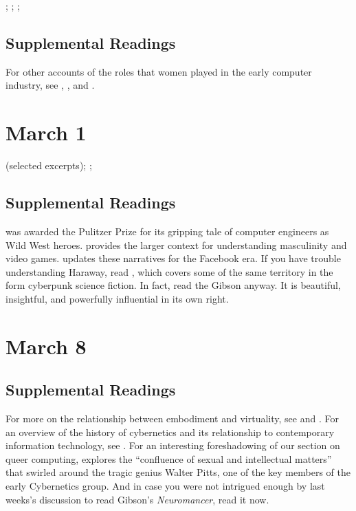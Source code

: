\documentclass[11pt]{article}
\begin{document}
; ; ;

\subsection{Supplemental Readings}
\label{sec:org04c01ec}

For other accounts of the roles that women played in the early computer
industry, see \cite{Shetterly:2016vl}, \cite{Grier:2005tq}, and
\cite{Gurer:1996it}.

\section{March 1}
\label{sec:orgf9e3bf0}

 (selected excerpts); 
; 

\subsection{Supplemental Readings}
\label{sec:org079b5b5}

\cite{Kidder:1981tj} was awarded the Pulitzer Prize for its gripping
tale of computer engineers as Wild West heroes. \cite{Kocurek:2015cg}
provides the larger context for understanding masculinity and video
games. \cite{Losse:2012um} updates these narratives for the Facebook
era. If you have trouble understanding Haraway, read
\cite{Gibson:1995un}, which covers some of the same territory in the
form cyberpunk science fiction. In fact, read the Gibson anyway. It is
beautiful, insightful, and powerfully influential in its own right.

\section{March 8}
\label{sec:org0e82ce4}


\subsection{Supplemental Readings}
\label{sec:org45c11d3}

For more on the relationship between embodiment and virtuality, see \cite{Stone:1996wp} and \cite{Balsamo:1996uc}.  For an overview of the history of cybernetics and its relationship to contemporary information technology, see \cite{Kline:2015ti}.  For an interesting foreshadowing of our section on queer computing, \cite{Wilson:2009wm} explores the ``confluence of sexual and intellectual matters'' that swirled around the tragic genius Walter Pitts, one of the key members of the early Cybernetics group. And in case you were not intrigued enough by last weeks's discussion to read Gibson's \emph{Neuromancer}, read it now.
\end{document}
